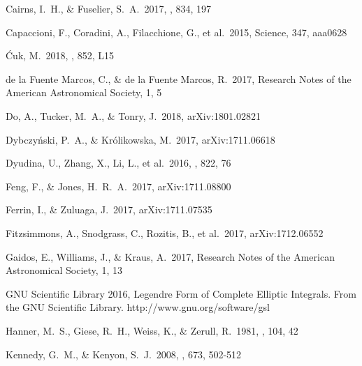 \documentclass[a4paper,fleqn,usenatbib]{mnras}
\begin{document}
\begin{thebibliography}{99}

 Cairns, I.~H., \& Fuselier, S.~A.\ 2017, \apj, 834, 197

 Capaccioni, F., Coradini, A., Filacchione, G., et al.\ 2015, Science, 347, aaa0628 

 {\'C}uk, M.\ 2018, \apjl, 852, L15

 de la Fuente Marcos, C., \& de la Fuente Marcos, R.\ 2017, Research Notes of the American Astronomical Society, 1, 5

 Do, A., Tucker, M.~A., \& Tonry, J.\ 2018, arXiv:1801.02821

 Dybczy{\'n}ski, P.~A., \& Kr{\'o}likowska, M.\ 2017, arXiv:1711.06618

 Dyudina, U., Zhang, X., Li, L., et al.\ 2016, \apj, 822, 76 

 Feng, F., \& Jones, H.~R.~A.\ 2017, arXiv:1711.08800

 Ferrin, I., \& Zuluaga, J.\ 2017, arXiv:1711.07535

 Fitzsimmons, A., Snodgrass, C., Rozitis, B., et al.\ 2017, arXiv:1712.06552

 Gaidos, E., Williams, J., \& Kraus, A.\ 2017, Research Notes of the American Astronomical Society, 1, 13

 GNU Scientific Library 2016, Legendre Form of Complete Elliptic Integrals. From the GNU Scientific Library. http://www.gnu.org/software/gsl

 Hanner, M.~S., Giese, R.~H., Weiss, K., \& Zerull, R.\ 1981, \aap, 104, 42 

 Kennedy, G.~M., \& Kenyon, S.~J.\ 2008, \apj, 673, 502-512 


\end{thebibliography}
\end{document}
